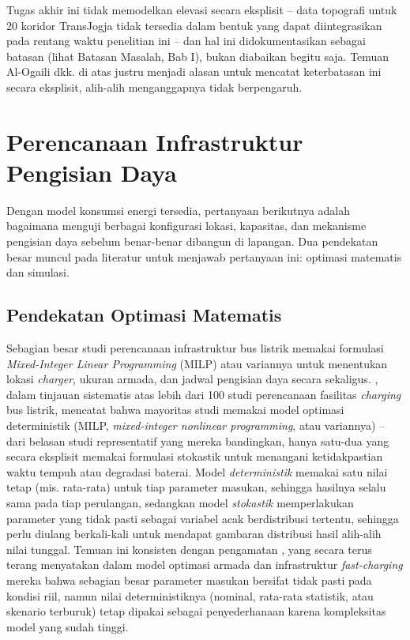 Tugas akhir ini tidak memodelkan elevasi secara eksplisit -- data topografi
untuk 20 koridor TransJogja tidak tersedia dalam bentuk yang dapat
diintegrasikan pada rentang waktu penelitian ini -- dan hal ini
didokumentasikan sebagai batasan (lihat Batasan Masalah, Bab I), bukan
diabaikan begitu saja. Temuan Al-Ogaili dkk. di atas justru menjadi alasan
untuk mencatat keterbatasan ini secara eksplisit, alih-alih menganggapnya
tidak berpengaruh.

\section{Perencanaan Infrastruktur Pengisian Daya}
\label{sec:perencanaan-infrastruktur}

Dengan model konsumsi energi tersedia, pertanyaan berikutnya adalah
bagaimana menguji berbagai konfigurasi lokasi, kapasitas, dan mekanisme
pengisian daya sebelum benar-benar dibangun di lapangan. Dua pendekatan
besar muncul pada literatur untuk menjawab pertanyaan ini: optimasi
matematis dan simulasi.

\subsection{Pendekatan Optimasi Matematis}

Sebagian besar studi perencanaan infrastruktur bus listrik memakai
formulasi \textit{Mixed-Integer Linear Programming} (MILP) atau variannya
untuk menentukan lokasi \textit{charger}, ukuran armada, dan jadwal
pengisian daya secara sekaligus. \textcite{zhou2024}, dalam
tinjauan sistematis atas lebih dari 100 studi perencanaan fasilitas
\textit{charging} bus listrik, mencatat bahwa mayoritas studi memakai model
optimasi deterministik (MILP, \textit{mixed-integer nonlinear programming},
atau variannya) -- dari belasan studi representatif yang mereka bandingkan,
hanya satu-dua yang secara eksplisit memakai formulasi stokastik untuk
menangani ketidakpastian waktu tempuh atau degradasi baterai. Model
\textit{deterministik} memakai satu nilai tetap (mis. rata-rata) untuk
tiap parameter masukan, sehingga hasilnya selalu sama pada tiap
perulangan, sedangkan model \textit{stokastik} memperlakukan parameter
yang tidak pasti sebagai variabel acak berdistribusi tertentu, sehingga
perlu diulang berkali-kali untuk mendapat gambaran distribusi hasil alih-alih
nilai tunggal. Temuan ini
konsisten dengan pengamatan \textcite{guschinsky2021}, yang
secara terus terang menyatakan dalam model optimasi armada dan
infrastruktur \textit{fast-charging} mereka bahwa sebagian besar parameter
masukan bersifat tidak pasti pada kondisi riil, namun nilai deterministiknya
(nominal, rata-rata statistik, atau skenario terburuk) tetap dipakai sebagai
penyederhanaan karena kompleksitas model yang sudah tinggi.


